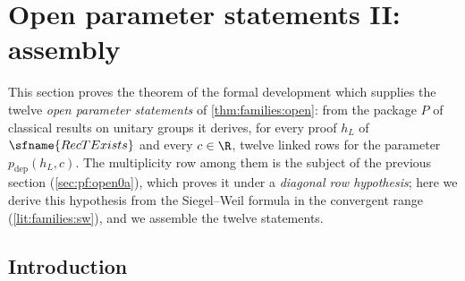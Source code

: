 \section{Open parameter statements II: assembly}\label{sec:pf:open0}

\providecommand{\openzeroMI}{\mathrm{MI}^{*}_{2}}
\providecommand{\openzeroHS}[1]{\|#1\|_{\mathrm{HS}}}
\providecommand{\openzerodev}{\operatorname{dev}}
\providecommand{\openzeromfL}{\operatorname{mfL}}
\providecommand{\openzerokfk}{\operatorname{kfk}}
\providecommand{\openzeroLk}{\mathrm{Lk}}
\providecommand{\openzeroEv}{\mathrm{Ev}}
\providecommand{\openzeroRow}{\sfname{Row}}
\providecommand{\openzeroLinked}{\sfname{LinkedAt}}
\providecommand{\openzeroAll}{\mathrm{All}}
\providecommand{\openzeroEvW}{\mathrm{EvW}}
\providecommand{\openzeroEvWC}{\mathrm{EvWC}}
\providecommand{\openzeroSC}{\mathrm{SC}}
\providecommand{\openzeroId}{\mathrm{Id}}
\providecommand{\openzeroDeg}{\mathrm{Deg}}
\providecommand{\openzeroNG}{\mathrm{NG}}
\providecommand{\openzeroGen}{\mathrm{Gen}}
\providecommand{\openzeroNZ}{\mathrm{NZ}}
\providecommand{\openzeropart}{\operatorname{part}}
\providecommand{\openzerovp}{\operatorname{vp}}
\providecommand{\openzerops}{\operatorname{ps}}
\providecommand{\openzeropa}{\operatorname{pa}}
\providecommand{\openzerobig}{\operatorname{big}}
\providecommand{\openzeroone}{\operatorname{one}}
\providecommand{\openzerogam}{\gamma}
\providecommand{\openzeroPg}{P_{\mathrm g}}
\providecommand{\openzeroGood}{\mathcal{G}}
\providecommand{\openzeroBuilt}{\mathcal{B}}
\providecommand{\openzeropdep}{p_{\mathrm{dep}}}
\providecommand{\openzeroDF}{\sfname{DefiniteSideCondition}}
\providecommand{\openzeroTrue}{E^{\mathrm{true}}}

This section proves the theorem of the formal development \cite{LeanSource2026} which supplies the twelve
\emph{open parameter statements} of \cref{thm:families:open}: from the package $P$ of classical results on unitary
groups it derives, for every proof $h_L$ of $\sfname{RecTExists}$ and every $c\in\R$, twelve linked rows for the
parameter $\openzeropdep(h_L,c)$. The multiplicity row among them is the subject of the previous section
(\cref{sec:pf:open0a}), which proves it under a \emph{diagonal row hypothesis}; here we derive this hypothesis from the
Siegel--Weil formula in the convergent range (\cref{lit:families:sw}), and we assemble the twelve statements.

\subsection{Introduction}\label{sec:pf:open0:intro}

